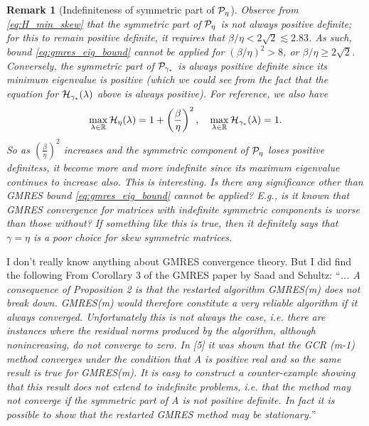\documentclass[a4paper,10pt]{article}
\newtheorem{remark}{Remark}
\begin{document}
{\begin{remark}[Indefiniteness of symmetric part of ${\cal P}_{\eta}$]
Observe from \eqref{eq:H_min_skew} that the symmetric part of ${\cal P}_{\eta}$ is not always positive definite; for this to remain positive definite, it requires that $\beta / \eta < 2 \sqrt{2} \lesssim 2.83$. As such, bound \eqref{eq:gmres_eig_bound} cannot be applied for $(\beta / \eta)^2 > 8$, or $\beta / \eta \geq 2 \sqrt{2}$. Conversely, the symmetric part of ${\cal P}_{\gamma_*}$ is always positive definite since its minimum eigenvalue is positive (which we could see from the fact that the equation for ${\cal H}_{\gamma_*}(\lambda) $ above is always positive).
%
For reference, we also have
\begin{align*}
\underset{\lambda \in \mathbb{R}}{\max} \,  {\cal H}_{\eta}(\lambda) = 1 + \left( \frac{\beta}{\eta} \right)^2,
\quad
\underset{\lambda \in \mathbb{R}}{\max} \,  {\cal H}_{\gamma_*}(\lambda) = 1.
\end{align*}
So as $\left( \frac{\beta}{\eta} \right)^2$ increases and the symmetric component of ${\cal P}_{\eta}$ loses positive definitess, it become more and more indefinite since its maximum eigenvalue continues to increase also.   
%
This is interesting. Is there any significance other than GMRES bound \eqref{eq:gmres_eig_bound} cannot be applied? E.g., is it known that GMRES convergence for matrices with indefinite symmetric components is worse than those without? If something like this is true, then it definitely says that $\gamma = \eta$ is a poor choice for skew symmetric matrices. 
\end{remark}
I don't really know anything about GMRES convergence theory. But I did find the following From Corollary 3 of the GMRES paper by Saad and Schultz: ``\textit{...
A consequence of Proposition 2 is that the restarted algorithm GMRES(m) does
not break down. GMRES(m) would therefore constitute a very reliable algorithm if
it always converged. Unfortunately this is not always the case, i.e. there are instances
where the residual norms produced by the algorithm, although nonincreasing, do not
converge to zero. In [5] it was shown that the GCR (m-1) method converges under
the condition that A is positive real and so the same result is true for GMRES(m).
It is easy to construct a counter-example showing that this result does not extend to
indefinite problems, i.e. that the method may not converge if the symmetric part of A
is not positive definite. In fact it is possible to show that the restarted GMRES method
may be stationary.}'' 

}
\end{document}
